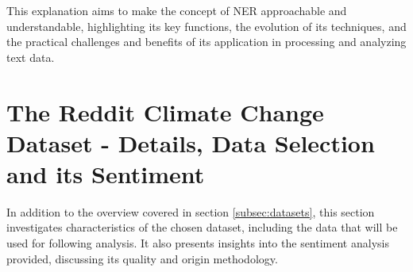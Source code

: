 This explanation aims to make the concept of NER approachable and understandable, highlighting its key functions, the evolution of its techniques, and the practical challenges and benefits of its application in processing and analyzing text data.

\section{The Reddit Climate Change Dataset - Details, Data Selection and its Sentiment}
\label{section:datasetdetails}
In addition to the overview covered in section \ref{subsec:datasets}, this section investigates characteristics of the chosen dataset, including the data that will be used for following analysis. It also presents insights into the sentiment analysis provided, discussing its quality and origin methodology.


